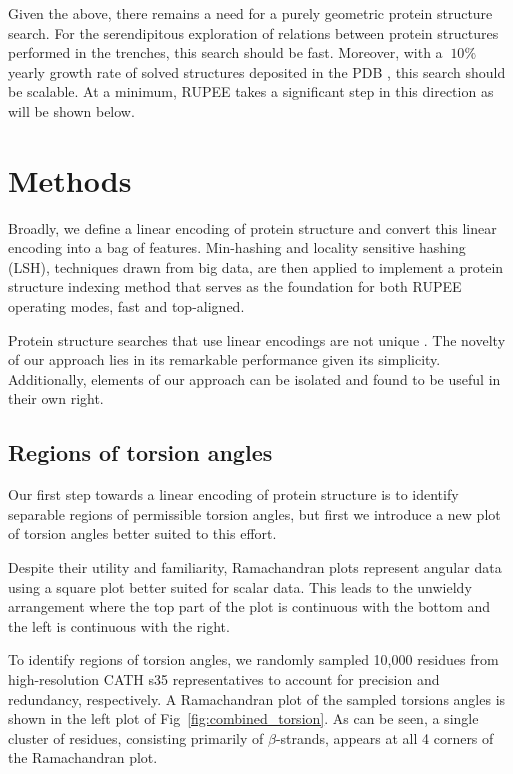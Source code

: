 \documentclass[10pt,letterpaper]{article}
\renewcommand{\figurename}{Fig}
\begin{document}
Given the above, there remains a need for a purely geometric protein structure search.
For the serendipitous exploration of relations between protein structures performed in the trenches, this search should be fast. 
Moreover, with a $~10\%$ yearly growth rate of solved structures deposited in the PDB \cite{gkw1000}, this search should be scalable. 
At a minimum, RUPEE takes a significant step in this direction as will be shown below. 

\section*{Methods}

Broadly, we define a linear encoding of protein structure and convert this linear encoding into a bag of features. 
Min-hashing and locality sensitive hashing (LSH), techniques drawn from big data, are then applied to implement a protein structure indexing method that serves as the foundation for both RUPEE operating modes, fast and top-aligned. 

Protein structure searches that use linear encodings are not unique \cite{Carpentier2005,Daniluk2011,Ritchie2012}.
The novelty of our approach lies in its remarkable performance given its simplicity. 
Additionally, elements of our approach can be isolated and found to be useful in their own right. 

\subsection*{Regions of torsion angles}

Our first step towards a linear encoding of protein structure is to identify separable regions of permissible torsion angles,
but first we introduce a new plot of torsion angles better suited to this effort. 

Despite their utility and familiarity, Ramachandran plots \cite{Ramachandran1968} represent angular data using a square plot better suited for scalar data.
This leads to the unwieldy arrangement where the top part of the plot is continuous with the bottom and the left is continuous with the right. 

To identify regions of torsion angles, we randomly sampled 10,000 residues from high-resolution CATH s35 representatives to account for precision and redundancy, respectively. 
A Ramachandran plot of the sampled torsions angles is shown in the left plot of \figurename~\ref{fig:combined_torsion}. 
As can be seen, a single cluster of residues, consisting primarily of $\beta$-strands, appears at all 4 corners of the Ramachandran plot.
\end{document}
